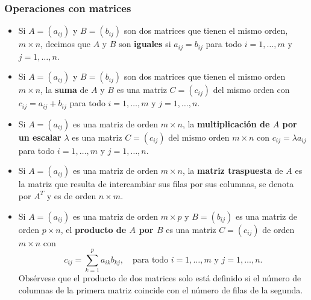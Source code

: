 \documentclass[12pt]{article}
\begin{document}
\subsubsection{Operaciones con matrices}

\begin{itemize}
\item Si $ A = (a_{ij}) $ y $ B = (b_{ij}) $ son dos matrices que tienen el mismo orden, $ m \times n $, decimos que $ A $ y $ B $ son \textbf{iguales} si $ a_{ij} = b_{ij} $ para todo $ i = 1, \ldots, m $ y $ j = 1, \ldots, n $.

\item Si $ A = (a_{ij}) $ y $ B = (b_{ij}) $ son dos matrices que tienen el mismo orden $ m \times n $, la \textbf{suma} de $ A $ y $ B $ es una matriz $ C = (c_{ij}) $ del mismo orden con $ c_{ij} = a_{ij} + b_{ij} $ para todo $ i = 1, \ldots, m $ y $ j = 1, \ldots, n $.

\item Si $ A = (a_{ij}) $ es una matriz de orden $ m \times n $, la \textbf{multiplicación de $ A $ por un escalar} $ \lambda $ es una matriz $ C = (c_{ij}) $ del mismo orden $ m \times n $ con $ c_{ij} = \lambda a_{ij} $ para todo $ i = 1, \ldots, m $ y $ j = 1, \ldots, n $.

\item Si $ A = (a_{ij}) $ es una matriz de orden $ m \times n $, la \textbf{matriz traspuesta} de $ A $ es la matriz que resulta de intercambiar sus filas por sus columnas, se denota por $ A^T $ y es de orden $ n \times m $.

\item Si $ A = (a_{ij}) $ es una matriz de orden $ m \times p $ y $ B = (b_{ij}) $ es una matriz de orden $ p \times n $, el \textbf{producto de $ A $ por $ B $} es una matriz $ C = (c_{ij}) $ de orden $ m \times n $ con $$c_{ij} = \sum_{k=1}^p a_{ik}b_{kj}, \quad \text{para todo } i = 1, \ldots, m \text{ y } j = 1, \ldots, n.$$ Obsérvese que el producto de dos matrices solo está definido si el número de columnas de la primera matriz coincide con el número de filas de la segunda.
\end{itemize}

\end{document}
